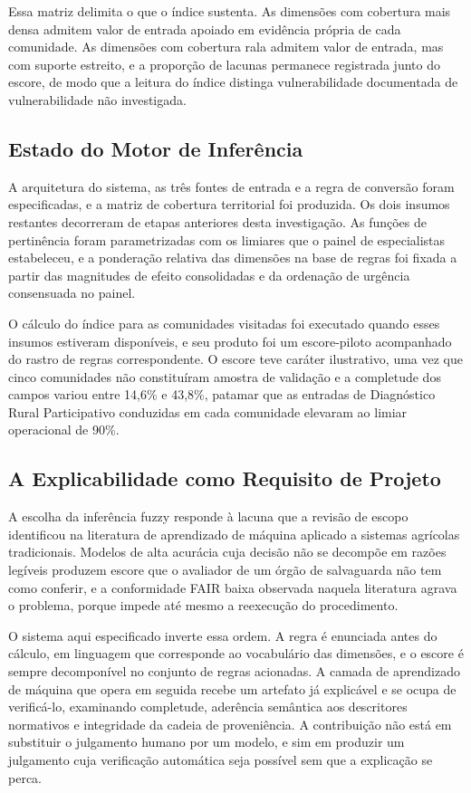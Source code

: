 \documentclass[pdflatex,sn-basic]{sn-jnl}%
\theoremstyle{thmstyleone}%
\theoremstyle{thmstyletwo}%
\theoremstyle{thmstylethree}%
\begin{document}
Essa matriz delimita o que o índice sustenta. As dimensões com cobertura mais densa admitem valor de entrada apoiado em evidência própria de cada comunidade. As dimensões com cobertura rala admitem valor de entrada, mas com suporte estreito, e a proporção de lacunas permanece registrada junto do escore, de modo que a leitura do índice distinga vulnerabilidade documentada de vulnerabilidade não investigada.

\subsection{Estado do Motor de Inferência}

A arquitetura do sistema, as três fontes de entrada e a regra de conversão foram especificadas, e a matriz de cobertura territorial foi produzida. Os dois insumos restantes decorreram de etapas anteriores desta investigação. As funções de pertinência foram parametrizadas com os limiares que o painel de especialistas estabeleceu, e a ponderação relativa das dimensões na base de regras foi fixada a partir das magnitudes de efeito consolidadas e da ordenação de urgência consensuada no painel.

O cálculo do índice para as comunidades visitadas foi executado quando esses insumos estiveram disponíveis, e seu produto foi um escore-piloto acompanhado do rastro de regras correspondente. O escore teve caráter ilustrativo, uma vez que cinco comunidades não constituíram amostra de validação e a completude dos campos variou entre 14,6\% e 43,8\%, patamar que as entradas de Diagnóstico Rural Participativo conduzidas em cada comunidade elevaram ao limiar operacional de 90\%.

\subsection{A Explicabilidade como Requisito de Projeto}

A escolha da inferência fuzzy responde à lacuna que a revisão de escopo identificou na literatura de aprendizado de máquina aplicado a sistemas agrícolas tradicionais. Modelos de alta acurácia cuja decisão não se decompõe em razões legíveis produzem escore que o avaliador de um órgão de salvaguarda não tem como conferir, e a conformidade FAIR baixa observada naquela literatura agrava o problema, porque impede até mesmo a reexecução do procedimento.

O sistema aqui especificado inverte essa ordem. A regra é enunciada antes do cálculo, em linguagem que corresponde ao vocabulário das dimensões, e o escore é sempre decomponível no conjunto de regras acionadas. A camada de aprendizado de máquina que opera em seguida recebe um artefato já explicável e se ocupa de verificá-lo, examinando completude, aderência semântica aos descritores normativos e integridade da cadeia de proveniência. A contribuição não está em substituir o julgamento humano por um modelo, e sim em produzir um julgamento cuja verificação automática seja possível sem que a explicação se perca.
\end{document}
